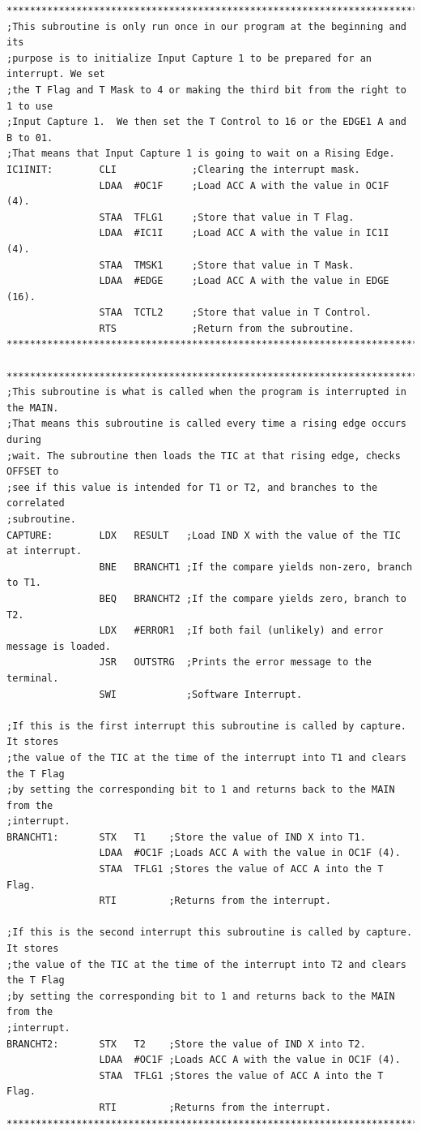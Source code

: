 \documentclass[12pt]{report}
\begin{document}
\begin{Verbatim}[frame=single, fontsize=\footnotesize]
****************************************************************************************
;This subroutine is only run once in our program at the beginning and its
;purpose is to initialize Input Capture 1 to be prepared for an interrupt. We set
;the T Flag and T Mask to 4 or making the third bit from the right to 1 to use
;Input Capture 1.  We then set the T Control to 16 or the EDGE1 A and B to 01.
;That means that Input Capture 1 is going to wait on a Rising Edge.
IC1INIT:        CLI             ;Clearing the interrupt mask.
                LDAA  #OC1F     ;Load ACC A with the value in OC1F (4).
                STAA  TFLG1     ;Store that value in T Flag.
                LDAA  #IC1I     ;Load ACC A with the value in IC1I (4).
                STAA  TMSK1     ;Store that value in T Mask.
                LDAA  #EDGE     ;Load ACC A with the value in EDGE (16).
                STAA  TCTL2     ;Store that value in T Control.
                RTS             ;Return from the subroutine.
****************************************************************************************

****************************************************************************************
;This subroutine is what is called when the program is interrupted in the MAIN.
;That means this subroutine is called every time a rising edge occurs during
;wait. The subroutine then loads the TIC at that rising edge, checks OFFSET to
;see if this value is intended for T1 or T2, and branches to the correlated
;subroutine.
CAPTURE:        LDX   RESULT   ;Load IND X with the value of the TIC at interrupt.
                BNE   BRANCHT1 ;If the compare yields non-zero, branch to T1.
                BEQ   BRANCHT2 ;If the compare yields zero, branch to T2.
                LDX   #ERROR1  ;If both fail (unlikely) and error message is loaded.
                JSR   OUTSTRG  ;Prints the error message to the terminal.
                SWI            ;Software Interrupt.

;If this is the first interrupt this subroutine is called by capture. It stores
;the value of the TIC at the time of the interrupt into T1 and clears the T Flag
;by setting the corresponding bit to 1 and returns back to the MAIN from the
;interrupt.
BRANCHT1:       STX   T1    ;Store the value of IND X into T1.
                LDAA  #OC1F ;Loads ACC A with the value in OC1F (4).
                STAA  TFLG1 ;Stores the value of ACC A into the T Flag.
                RTI         ;Returns from the interrupt.

;If this is the second interrupt this subroutine is called by capture. It stores
;the value of the TIC at the time of the interrupt into T2 and clears the T Flag
;by setting the corresponding bit to 1 and returns back to the MAIN from the
;interrupt.
BRANCHT2:       STX   T2    ;Store the value of IND X into T2.
                LDAA  #OC1F ;Loads ACC A with the value in OC1F (4).
                STAA  TFLG1 ;Stores the value of ACC A into the T Flag.
                RTI         ;Returns from the interrupt.
****************************************************************************************


\end{Verbatim}
\end{document}
